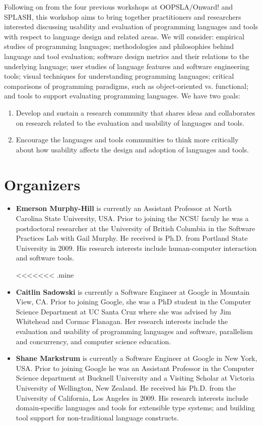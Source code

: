 \documentclass{sigplanconf}
\begin{document}
Following on from the four previous workshops at OOPSLA/Onward! 
and SPLASH, this workshop aims to bring together practitioners and
researchers interested discussing usability and evaluation of
programming languages and tools with respect to language design and
related areas. We will consider: empirical studies of programming
languages; methodologies and philosophies behind language and tool
evaluation; software design metrics and their relations to the
underlying language; user studies of language features and software
engineering tools; visual techniques for understanding programming
languages; critical comparisons of programming paradigms, such as
object-oriented vs. functional; and tools to support evaluating
programming languages. We have two goals:

\begin{enumerate}
  \item 
Develop and sustain a research community that shares ideas and collaborates on 
research related to the evaluation and usability of languages and tools.
\item
Encourage the languages and tools communities to think more critically
about how usability affects the  design and adoption of languages and tools.
\end{enumerate}


\section{Organizers}

\begin{itemize}
  
\item \textbf{Emerson Murphy-Hill} is currently an Assistant Professor at North Carolina State University, USA. Prior to joining the NCSU faculy he was a postdoctoral researcher at the University of British Columbia in the Software Practices Lab with Gail Murphy. 
  He received is Ph.D. from Portland State University in 2009.
  His research interests include human-computer interaction and software tools. 

<<<<<<< .mine
\item \textbf{Caitlin Sadowski} is currently a Software Engineer at Google in Mountain View, CA.
  Prior to joining Google, she was a PhD student in the 
  Computer Science Department at UC Santa Cruz where she was advised by Jim Whitehead and Cormac Flanagan. 
  Her research interests include the evaluation and usability of programming languages and software, parallelism and concurrency, and computer science education.
  
 \item \textbf{Shane Markstrum} is currently a Software Engineer at Google in New York, USA. Prior to joining Google he was an Assistant Professor in the Computer Science
  department at Bucknell University and a Visiting Scholar at Victoria University of Wellington, New Zealand. He received his Ph.D. from the University of
  California, Los Angeles in 2009. His research interests include
  domain-specific languages and tools for extensible type systems; and 
  building tool support for non-traditional language constructs.
\end{itemize}
\end{document}
